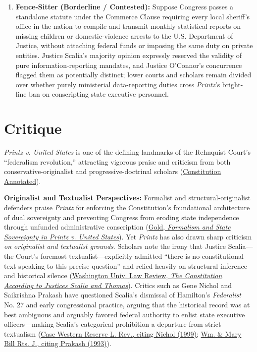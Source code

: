 \documentclass[12pt]{article}
\begin{document}
\begin{enumerate}
\item \textbf{Fence-Sitter (Borderline / Contested):} Suppose Congress passes a standalone statute under the Commerce Clause requiring every local sheriff's office in the nation to compile and transmit monthly statistical reports on missing children or domestic-violence arrests to the U.S. Department of Justice, without attaching federal funds or imposing the same duty on private entities. Justice Scalia's majority opinion expressly reserved the validity of pure information-reporting mandates, and Justice O'Connor's concurrence flagged them as potentially distinct; lower courts and scholars remain divided over whether purely ministerial data-reporting duties cross \textit{Printz}'s bright-line ban on conscripting state executive personnel.
\end{enumerate}

\section{Critique}
\textit{Printz v. United States} is one of the defining landmarks of the Rehnquist Court's ``federalism revolution,'' attracting vigorous praise and criticism from both conservative-originalist and progressive-doctrinal scholars (\href{https://constitution.congress.gov/browse/essay/amdt10-4-2/ALDE_00013627/}{Constitution Annotated}).

\textbf{Originalist and Textualist Perspectives:} Formalist and structural-originalist defenders praise \textit{Printz} for enforcing the Constitution's foundational architecture of dual sovereignty and preventing Congress from eroding state independence through unfunded administrative conscription (\href{https://brooklynworks.brooklaw.edu/context/faculty/article/2006/viewcontent/Gold22.pdf}{Gold, \textit{Formalism and State Sovereignty in Printz v. United States}}). Yet \textit{Printz} has also drawn sharp criticism \textit{on originalist and textualist grounds}. Scholars note the irony that Justice Scalia---the Court's foremost textualist---explicitly admitted ``there is no constitutional text speaking to this precise question'' and relied heavily on structural inference and historical silence (\href{https://journals.library.wustl.edu/lawreview/article/5537/galley/22370/view/}{Washington Univ. Law Review, \textit{The Constitution According to Justices Scalia and Thomas}}). Critics such as Gene Nichol and Saikrishna Prakash have questioned Scalia's dismissal of Hamilton's \textit{Federalist} No. 27 and early congressional practice, arguing that the historical record was at best ambiguous and arguably favored federal authority to enlist state executive officers---making Scalia's categorical prohibition a departure from strict textualism (\href{https://scholarlycommons.law.case.edu/cgi/viewcontent.cgi?article=1253&context=caselrev}{Case Western Reserve L. Rev., citing Nichol (1999)}; \href{https://scholarship.law.wm.edu/cgi/viewcontent.cgi?article=1572&context=wmborj}{Wm. \& Mary Bill Rts. J., citing Prakash (1993)}).
\end{document}
